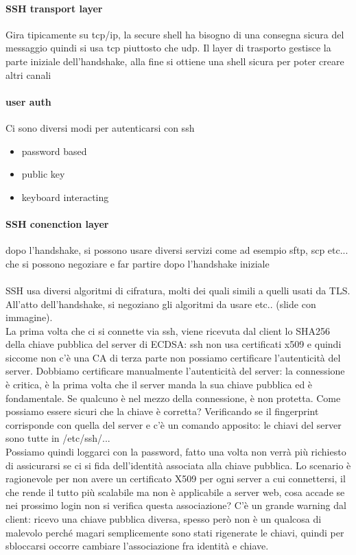 \documentclass[12pt, oneside]{extbook} %
\begin{document}
\paragraph{SSH transport layer} Gira tipicamente su tcp/ip, la secure shell ha bisogno di una consegna sicura del messaggio quindi si usa tcp piuttosto che udp. Il layer di trasporto gestisce la parte iniziale dell'handshake, alla fine si ottiene una shell sicura per poter creare altri canali
\paragraph{user auth} Ci sono diversi modi per autenticarsi con ssh
\begin{itemize}
\item password based
\item public key
\item keyboard interacting
\end{itemize}
\paragraph{SSH conenction layer} dopo l'handshake, si possono usare diversi servizi come ad esempio sftp, scp etc... che si possono negoziare e far partire dopo l'handshake iniziale\\\\
SSH usa diversi algoritmi di cifratura, molti dei quali simili a quelli usati da TLS.\\ All'atto dell'handshake, si negoziano gli algoritmi da usare etc.. (slide con immagine). \\ La prima volta che ci si connette via ssh, viene ricevuta dal client lo SHA256 della chiave pubblica del server di ECDSA: ssh non usa certificati x509 e quindi siccome non c'è una CA di terza parte non possiamo certificare l'autenticità del server. Dobbiamo certificare manualmente l'autenticità del server: la connessione è critica, è la prima volta che il server manda la sua chiave pubblica ed è fondamentale. Se qualcuno è nel mezzo della connessione, è non protetta. Come possiamo essere sicuri che la chiave è corretta? Verificando se il fingerprint corrisponde con quella del server e c'è un comando apposito: le chiavi del server sono tutte in \textsf{/etc/ssh/...}\\ Possiamo quindi loggarci con la password, fatto una volta non verrà più richiesto di assicurarsi se ci si fida dell'identità associata alla chiave pubblica. Lo scenario è ragionevole per non avere un certificato X509 per ogni server a cui connettersi, il che rende il tutto più scalabile ma non è applicabile a server web, cosa accade se nei prossimo login non si verifica questa associazione? C'è un grande warning dal client: ricevo una chiave pubblica diversa, spesso però non è un qualcosa di malevolo perché magari semplicemente sono stati rigenerate le chiavi, quindi per sbloccarsi occorre cambiare l'associazione fra identità e chiave.
\end{document}
